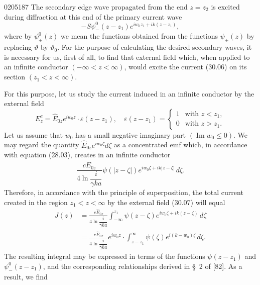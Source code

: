 \begin{scanpage}{0205}{187}
The secondary edge wave propagated from the end $z=z_2$ is excited during diffraction at this end of the primary current wave
\[-S\psi_-^0(z-z_1)e^{iw_0z_1+ik(z-z_1)},\tag{30.06}\]
where by $\psi_\pm^0(z)$ we mean the functions obtained from the functions $\psi_\pm(z)$ by replacing $\vartheta$ by $\vartheta_0$. For the purpose of calculating the desired secondary waves, it is necessary for us, first of all, to find that external field which, when applied to an infinite conductor $(-\infty<z<\infty)$, would excite the current (30.06) on its section $(z_1<z<\infty)$.

For this purpose, let us study the current induced in an infinite conductor by the external field
\[
E_z^e=\hat E_{0z}e^{iw_0z}\cdot\varepsilon(z-z_1),\quad
\varepsilon(z-z_1)=\begin{cases}1&\text{with }z<z_1,\\0&\text{with }z>z_1.\end{cases}\tag{30.07}
\]
Let us assume that $w_0$ has a small negative imaginary part $(\operatorname{Im}w_0\leq0)$. We may regard the quantity $\hat E_{0z}e^{iw_0\zeta}d\zeta$ as a concentrated emf which, in accordance with equation (28.03), creates in an infinite conductor
\[
\frac{c\hat E_{0z}}{4\ln\dfrac{i}{\gamma ka}}\psi(|z-\zeta|)e^{iw_0\zeta+ik|z-\zeta|}\,d\zeta.\tag{30.08}
\]
Therefore, in accordance with the principle of superposition, the total current created in the region $z_1<z<\infty$ by the external field (30.07) will equal
\[
\begin{aligned}
J(z)&=\frac{c\hat E_{0z}}{4\ln\dfrac{i}{\gamma ka}}\int_{-\infty}^{z_1}\psi(z-\zeta)e^{iw_0\zeta+ik(z-\zeta)}\,d\zeta\\
&=\frac{c\hat E_{0z}}{4\ln\dfrac{i}{\gamma ka}}e^{iw_0z}\cdot\int_{z-z_1}^{\infty}\psi(\zeta)e^{i(k-w_0)\zeta}\,d\zeta.
\end{aligned}\tag{30.09}
\]
The resulting integral may be expressed in terms of the functions $\psi(z-z_1)$ and $\psi_-^0(z-z_1)$, and the corresponding relationships derived in \S\ 2 of [82]. As a result, we find
\end{scanpage}
